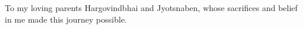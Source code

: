 \begin{center}
\vspace*{52pt}
To my loving parents Hargovindbhai and Jyotsnaben, whose sacrifices and belief in me made this journey possible.
\end{center}
\pagebreak
